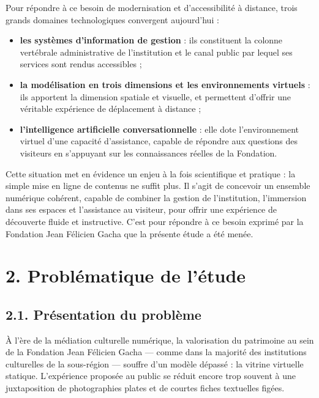 Pour répondre à ce besoin de modernisation et d'accessibilité à distance, trois
grands domaines technologiques convergent aujourd'hui :

\begin{itemize}
  \item \textbf{les systèmes d'information de gestion} : ils constituent la
        colonne vertébrale administrative de l'institution et le canal public
        par lequel ses services sont rendus accessibles ;
  \item \textbf{la modélisation en trois dimensions et les environnements
        virtuels} : ils apportent la dimension spatiale et visuelle, et
        permettent d'offrir une véritable expérience de déplacement à distance ;
  \item \textbf{l'intelligence artificielle conversationnelle} : elle dote
        l'environnement virtuel d'une capacité d'assistance, capable de répondre
        aux questions des visiteurs en s'appuyant sur les connaissances réelles
        de la Fondation.
\end{itemize}

Cette situation met en évidence un enjeu à la fois scientifique et pratique : la
simple mise en ligne de contenus ne suffit plus. Il s'agit de concevoir un
ensemble numérique cohérent, capable de combiner la gestion de l'institution,
l'immersion dans ses espaces et l'assistance au visiteur, pour offrir une
expérience de découverte fluide et instructive. C'est pour répondre à ce besoin
exprimé par la Fondation Jean Félicien Gacha que la présente étude a été menée.

\section*{2. Problématique de l'étude}

\subsection*{2.1. Présentation du problème}

À l'ère de la médiation culturelle numérique, la valorisation du patrimoine au
sein de la Fondation Jean Félicien Gacha — comme dans la majorité des
institutions culturelles de la sous-région — souffre d'un modèle dépassé : la
vitrine virtuelle statique. L'expérience proposée au public se réduit encore
trop souvent à une juxtaposition de photographies plates et de courtes fiches
textuelles figées.

